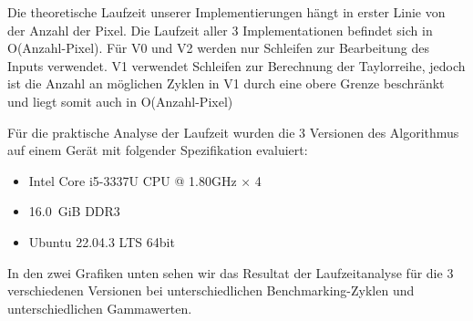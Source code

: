 \documentclass[course=erap]{aspdoc}
\begin{document}
\par
Die theoretische Laufzeit unserer Implementierungen hängt in erster Linie von der Anzahl der Pixel. Die Laufzeit aller 3 Implementationen befindet sich in O(Anzahl-Pixel). Für V0 und V2 werden nur Schleifen zur Bearbeitung des Inputs verwendet. V1 verwendet Schleifen zur Berechnung der Taylorreihe, jedoch ist die Anzahl an möglichen Zyklen in V1 durch eine obere Grenze beschränkt und liegt somit auch in O(Anzahl-Pixel)

\par
Für die praktische Analyse der Laufzeit wurden die 3 Versionen des Algorithmus auf einem Gerät mit folgender Spezifikation evaluiert:

\begin{itemize}
\item Intel Core i5-3337U CPU @ 1.80GHz × 4
\item 16.0 GiB DDR3
\item Ubuntu 22.04.3 LTS 64bit
\end{itemize}

\par
In den zwei Grafiken unten sehen wir das Resultat der Laufzeitanalyse für die 3 verschiedenen Versionen bei unterschiedlichen Benchmarking-Zyklen und unterschiedlichen Gammawerten.
\end{document}
